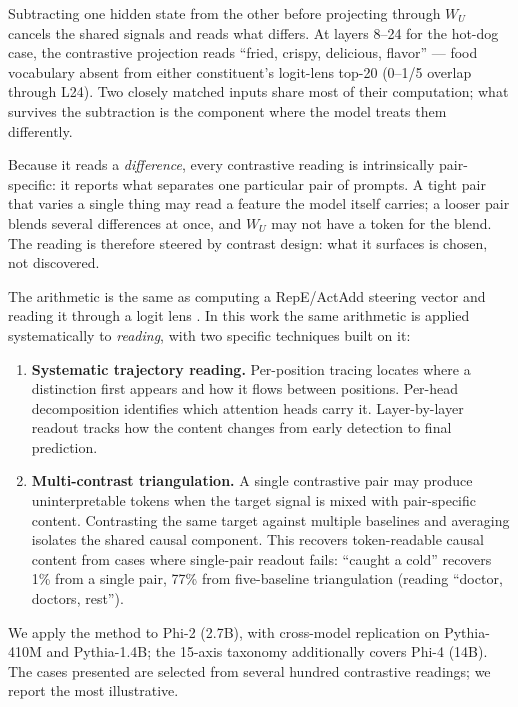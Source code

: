 \documentclass[11pt]{article}
\newcommand{\WU}{W_U}
\begin{document}
Subtracting one hidden state from the other before projecting through $\WU$
cancels the shared signals and reads what differs. At layers 8--24 for the
hot-dog case, the contrastive projection reads ``fried, crispy, delicious,
flavor'' --- food vocabulary absent from either constituent's logit-lens top-20
(0--1/5 overlap through L24). Two closely matched inputs share most of
their computation; what survives the subtraction is the component where
the model treats them differently.

Because it reads a \emph{difference}, every contrastive reading is
intrinsically pair-specific: it reports what separates one particular
pair of prompts. A tight pair that varies a single thing may read a
feature the model itself carries; a looser pair blends several
differences at once, and $\WU$ may not have a token for the blend.
The reading is therefore steered by contrast design: what it surfaces
is chosen, not discovered.

The arithmetic is the same as computing a RepE/ActAdd steering vector
\citep{zou2023,turner2023} and reading it through a logit lens
\citep{nostalgebraist2020}. In this work the same arithmetic is applied
systematically to \emph{reading}, with two specific techniques built on it:

\begin{enumerate}[leftmargin=*]
\item \textbf{Systematic trajectory reading.} Per-position tracing locates where a
   distinction first appears and how it flows between positions. Per-head
   decomposition identifies which attention heads carry it. Layer-by-layer
   readout tracks how the content changes from early detection to final
   prediction.

\item \textbf{Multi-contrast triangulation.} A single contrastive pair may produce
   uninterpretable tokens when the target signal is mixed with
   pair-specific content. Contrasting the same target against multiple baselines
   and averaging isolates the shared causal component. This recovers
   token-readable causal content from cases where single-pair readout fails:
   ``caught a cold'' recovers 1\% from a single pair, 77\% from five-baseline
   triangulation (reading ``doctor, doctors, rest'').
\end{enumerate}

We apply the method to Phi-2 (2.7B), with cross-model replication on
Pythia-410M and Pythia-1.4B; the 15-axis taxonomy additionally covers
Phi-4 (14B). The cases presented are
selected from several hundred contrastive readings; we report the most
illustrative.
\end{document}
